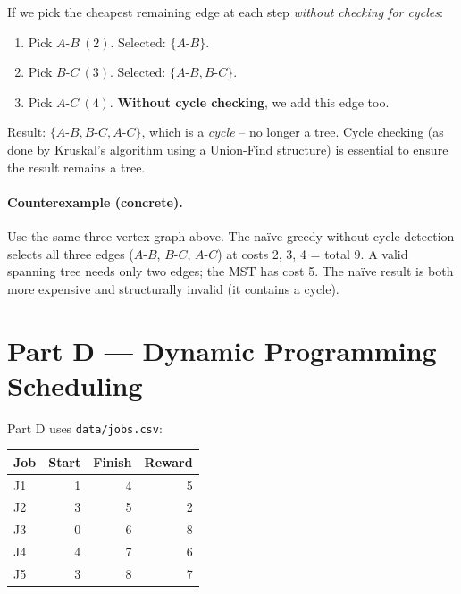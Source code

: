 \documentclass[11pt,a4paper]{article}
\begin{document}
If we pick the cheapest remaining edge at each step \emph{without checking for cycles}:
\begin{enumerate}[noitemsep]
  \item Pick $A\text{-}B\ (2)$. Selected: $\{A\text{-}B\}$.
  \item Pick $B\text{-}C\ (3)$. Selected: $\{A\text{-}B, B\text{-}C\}$.
  \item Pick $A\text{-}C\ (4)$. \textbf{Without cycle checking}, we add this edge too.
\end{enumerate}
Result: $\{A\text{-}B, B\text{-}C, A\text{-}C\}$, which is a \emph{cycle} -- no longer a tree. Cycle checking (as done by Kruskal's algorithm using a Union-Find structure) is essential to ensure the result remains a tree.

\paragraph{Counterexample (concrete).}
Use the same three-vertex graph above. The na\"ive greedy without cycle detection selects all three edges ($A\text{-}B$, $B\text{-}C$, $A\text{-}C$) at costs 2, 3, 4 = total 9. A valid spanning tree needs only two edges; the MST has cost 5. The na\"ive result is both more expensive and structurally invalid (it contains a cycle).

\section{Part D --- Dynamic Programming Scheduling}

Part D uses \texttt{data/jobs.csv}:

\begin{center}
\begin{tabular}{lrrr}
\toprule
Job & Start & Finish & Reward \\
\midrule
J1 & 1 & 4 & 5 \\
J2 & 3 & 5 & 2 \\
J3 & 0 & 6 & 8 \\
J4 & 4 & 7 & 6 \\
J5 & 3 & 8 & 7 \\
\bottomrule
\end{tabular}
\end{center}

\end{document}

